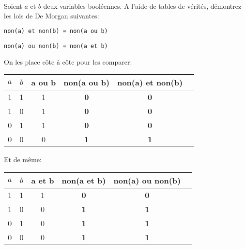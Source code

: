 \documentclass[12pt]{article}
\begin{document}
	\begin{MonExo}
		Soient $a$ et $b$ deux variables booléennes. A l’aide de tables de vérités, démontrez les lois de De Morgan suivantes:
		\begin{alphenum}
			\item \texttt{non(a) et non(b) = non(a ou b)}
			\item \texttt{non(a) ou non(b) = non(a et b)}
		\end{alphenum}
	\end{MonExo}
	\begin{MaReponse}
		\begin{alphenum}
			\item 
			On les place côte à côte pour les comparer:
			\begin{center}		
				\begin{tabular}{|c|c|c|c|c|c|}
					\hline
					$a$ & $b$ & a ou b & \textbf{non(a ou b)} & \textbf{non(a) et non(b)} \\ \hline
					1 & 1 & 1 & \textbf{0} & \textbf{0}  \\ \hline
					1 & 0& 1 & \textbf{0} & \textbf{0}  \\ \hline
					0 & 1 & 1 & \textbf{0} & \textbf{0} \\ \hline
					0 & 0 & 0 & \textbf{1} & \textbf{1}  \\ \hline
				\end{tabular}
			\end{center}
			\item 
			Et de même:
			\begin{center}		
				\begin{tabular}{|c|c|c|c|c|c|}
					\hline
					$a$ & $b$ & a et b & \textbf{non(a et b)} & \textbf{non(a) ou non(b)} \\ \hline
					1 & 1 & 1 & \textbf{0} & \textbf{0}  \\ \hline
					1 & 0& 0 & \textbf{1} & \textbf{1}  \\ \hline
					0 & 1 & 0 & \textbf{1} & \textbf{1} \\ \hline
					0 & 0 & 0 & \textbf{1} & \textbf{1}  \\ \hline
				\end{tabular}
			\end{center}
		\end{alphenum}
	\end{MaReponse}
\end{document}

